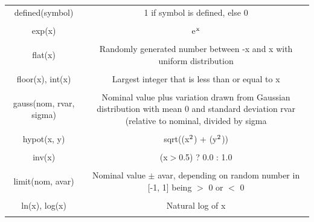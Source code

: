\begin{longtable}{c c}
defined(symbol) & \begin{minipage}{20em}
1 if symbol is defined, else 0
\end{minipage}\\ \\

exp(x) & \begin{minipage}{20em}
e$\rm{^x}$
\end{minipage}\\ \\

flat(x) & \begin{minipage}{20em}
Randomly generated number between -x and x with uniform distribution
\end{minipage}\\ \\

floor(x), int(x) & \begin{minipage}{20em}
Largest integer that is less than or equal to x
\end{minipage}\\ \\

gauss(nom, rvar, sigma) & \begin{minipage}{20em}
Nominal value plus variation drawn from Gaussian distribution with mean 0 and standard deviation rvar (relative to nominal, divided by sigma
\end{minipage}\\ \\

hypot(x, y) & \begin{minipage}{20em}
sqrt((x$\rm{^2}$) + (y$\rm{^2}$))
\end{minipage}\\ \\

inv(x) & \begin{minipage}{20em}
(x$>$0.5) ? 0.0 : 1.0
\end{minipage}\\ \\

limit(nom, avar) & \begin{minipage}{20em}
Nominal value $\pm$ avar, depending on random number in [-1, 1] being $>$ 0 or $<$ 0
\end{minipage}\\ \\

ln(x), log(x) & \begin{minipage}{20em}
Natural log of x
\end{minipage}\\ \\


\end{longtable}
